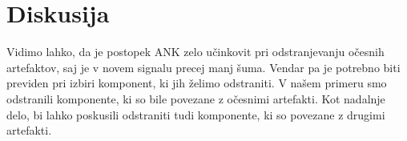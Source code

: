 \documentclass{article}
\begin{document}
\section{Diskusija}
\label{sec:discussion}

Vidimo lahko, da je postopek ANK zelo učinkovit pri odstranjevanju očesnih artefaktov, saj je v novem signalu precej manj šuma. Vendar pa je potrebno biti previden pri izbiri komponent, ki jih želimo odstraniti. V našem primeru smo odstranili komponente, ki so bile povezane z očesnimi artefakti. Kot nadalnje delo, bi lahko poskusili odstraniti tudi komponente, ki so povezane z drugimi artefakti.
\end{document}
